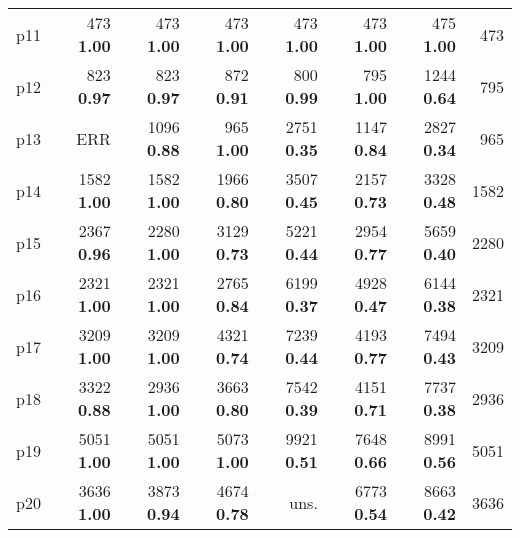 \begin{tabular}{|l|rrrrrr|r|}
p11 & {\footnotesize 473} \textbf{1.00} & {\footnotesize 473} \textbf{1.00} & {\footnotesize 473} \textbf{1.00} & {\footnotesize 473} \textbf{1.00} & {\footnotesize 473} \textbf{1.00} & {\footnotesize 475} \textbf{1.00} & 473\\
p12 & {\footnotesize 823} \textbf{0.97} & {\footnotesize 823} \textbf{0.97} & {\footnotesize 872} \textbf{0.91} & {\footnotesize 800} \textbf{0.99} & {\footnotesize 795} \textbf{1.00} & {\footnotesize 1244} \textbf{0.64} & 795\\
p13 & ERR & {\footnotesize 1096} \textbf{0.88} & {\footnotesize 965} \textbf{1.00} & {\footnotesize 2751} \textbf{0.35} & {\footnotesize 1147} \textbf{0.84} & {\footnotesize 2827} \textbf{0.34} & 965\\
p14 & {\footnotesize 1582} \textbf{1.00} & {\footnotesize 1582} \textbf{1.00} & {\footnotesize 1966} \textbf{0.80} & {\footnotesize 3507} \textbf{0.45} & {\footnotesize 2157} \textbf{0.73} & {\footnotesize 3328} \textbf{0.48} & 1582\\
p15 & {\footnotesize 2367} \textbf{0.96} & {\footnotesize 2280} \textbf{1.00} & {\footnotesize 3129} \textbf{0.73} & {\footnotesize 5221} \textbf{0.44} & {\footnotesize 2954} \textbf{0.77} & {\footnotesize 5659} \textbf{0.40} & 2280\\
p16 & {\footnotesize 2321} \textbf{1.00} & {\footnotesize 2321} \textbf{1.00} & {\footnotesize 2765} \textbf{0.84} & {\footnotesize 6199} \textbf{0.37} & {\footnotesize 4928} \textbf{0.47} & {\footnotesize 6144} \textbf{0.38} & 2321\\
p17 & {\footnotesize 3209} \textbf{1.00} & {\footnotesize 3209} \textbf{1.00} & {\footnotesize 4321} \textbf{0.74} & {\footnotesize 7239} \textbf{0.44} & {\footnotesize 4193} \textbf{0.77} & {\footnotesize 7494} \textbf{0.43} & 3209\\
p18 & {\footnotesize 3322} \textbf{0.88} & {\footnotesize 2936} \textbf{1.00} & {\footnotesize 3663} \textbf{0.80} & {\footnotesize 7542} \textbf{0.39} & {\footnotesize 4151} \textbf{0.71} & {\footnotesize 7737} \textbf{0.38} & 2936\\
p19 & {\footnotesize 5051} \textbf{1.00} & {\footnotesize 5051} \textbf{1.00} & {\footnotesize 5073} \textbf{1.00} & {\footnotesize 9921} \textbf{0.51} & {\footnotesize 7648} \textbf{0.66} & {\footnotesize 8991} \textbf{0.56} & 5051\\
p20 & {\footnotesize 3636} \textbf{1.00} & {\footnotesize 3873} \textbf{0.94} & {\footnotesize 4674} \textbf{0.78} & uns. & {\footnotesize 6773} \textbf{0.54} & {\footnotesize 8663} \textbf{0.42} & 3636\\

\end{tabular}
